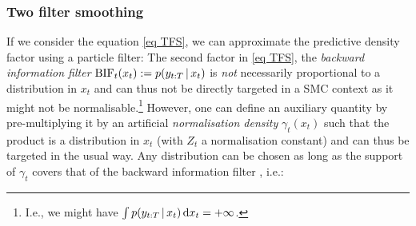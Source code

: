 \subsubsection{\label{introTFS}Two filter smoothing}
If we consider the equation \eqref{eq TFS}, we can approximate the predictive density factor using a particle filter:%
%
%
The second factor in \eqref{eq TFS}, the \emph{backward information filter} $\text{BIF}_t(x_t):=p(y_{t:T}\,|\, x_{t})$ is \emph{not} necessarily proportional to a distribution in $x_{t}$ and can thus not be directly targeted in a SMC context as it might not be normalisable.\footnote{I.e., we might have $\int p(y_{t:T}\,|\, x_{t})\,\mathrm{d} x_{t}=+\infty$.} However, one can define an auxiliary quantity by pre-multiplying it by an artificial \emph{normalisation density} $\gamma_{t}(x_{t})$ such that the product
%
%
is a distribution in $x_{t}$ (with $Z_{t}$ a normalisation constant) and can thus be targeted in the usual way. Any distribution can be chosen as long as the support of $\gamma_{t}$ covers that of the backward information filter \citep{briers10}, i.e.:
%
%
%
